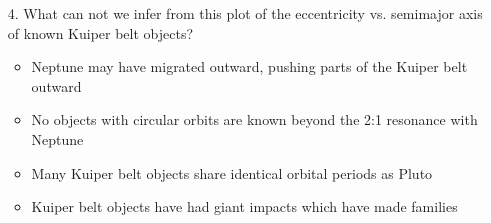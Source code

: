\begin{enumerate}
    \begin{multicols}{2} \begin{itemize}[label={$\bullet$}]
        \item The slopes measured for the CAIs would all be nearly identical, while the slopes measured for the chondrites would range from that of the CAIs to larger (steeper) values
        \item The slope of each measured line would be nearly identical. The intercepts for the CAIs would all be equal, and the intercepts for the chondrites would range from that of the CAI to larger values.
        \item The slopes measured for the CAIs would all be nearly identical, while the slopes measured for the chondrites would all be smaller (shallower)
        \item The slopes measured for the CAIs would all be nearly identical, while the slopes measured for the chondrites would range from that of the CAIs to smaller (shallower) values
        \item The slopes measured for the CAIs would all be nearly identical, while the slopes measured for the chondrites would all be larger (steeper).
        \item The slope of each measured line would be nearly identical, but the intercepts for the CAIs would all be smaller than the intercepts for the chondrites.
        \item The slope of each measured line would be nearly identical. The intercepts for the CAIs would all be equal, and the intercepts for the chondrites would range from that of the CAI to smaller values. 
    \end{itemize}\end{multicols}
    \item[4.] What can not we infer from this plot of the eccentricity vs. semimajor axis of known Kuiper belt objects?
    \begin{multicols}{2} \begin{itemize}[label={$\bullet$}]
        \item Neptune may have migrated outward, pushing parts of the Kuiper belt outward
        \item No objects with circular orbits are known beyond the 2:1 resonance with Neptune
        \item Many Kuiper belt objects share identical orbital periods as Pluto
        \item Kuiper belt objects have had giant impacts which have made families

\end{itemize}
\end{multicols}
\end{enumerate}
